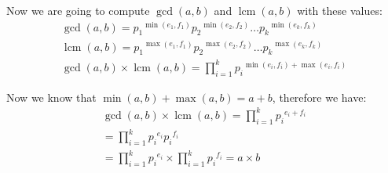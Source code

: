 \documentclass[12pt]{article}
\begin{document}
Now we are going to compute $\gcd(a, b)$ and $\operatorname{lcm}(a, b)$ with these values:
\begin{gather*}
    \gcd(a, b) = {p_{1}}^{\min(e_{1}, f_{1})} {p_{2}}^{\min(e_{2}, f_{2})} \ldots {p_{k}}^{\min(e_{k}, f_{k})} \\
    \operatorname{lcm}(a, b) = {p_{1}}^{\max(e_{1}, f_{1})} {p_{2}}^{\max(e_{2}, f_{2})} \ldots {p_{k}}^{\max(e_{k}, f_{k})} \\
    \gcd(a, b) \times \operatorname{lcm}(a, b) = \prod_{i=1}^{k} {p_{i}}^{\min(e_{i}, f_{i})+\max(e_{i}, f_{i})}
\end{gather*}

Now we know that $\min(a, b) + \max(a, b) = a+b$, therefore we have:
\begin{gather*}
    \gcd(a, b) \times \operatorname{lcm}(a, b) = \prod_{i=1}^{k} {p_{i}}^{e_{i} + f_{i}} \\
    = \prod_{i=1}^{k} {p_{i}}^{e_{i}} {p_{i}}^{f_{i}} \\
    = \prod_{i=1}^{k} {p_{i}}^{e_{i}} \times \prod_{i=1}^{k} {p_{i}}^{f_{i}} = a \times b
\end{gather*}
\end{document}
